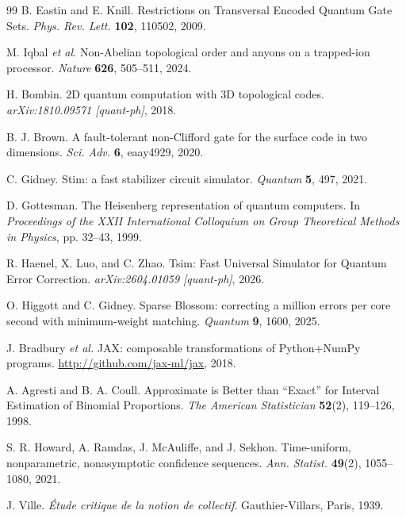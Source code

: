 \documentclass[a4paper]{article}
\begin{document}
\begin{thebibliography}{99}
B. Eastin and E. Knill.
\newblock Restrictions on Transversal Encoded Quantum Gate Sets.
\newblock \textit{Phys. Rev. Lett.} \textbf{102}, 110502, 2009.

M. Iqbal \textit{et al.}
\newblock Non-Abelian topological order and anyons on a trapped-ion processor.
\newblock \textit{Nature} \textbf{626}, 505--511, 2024.

H. Bombin.
\newblock 2D quantum computation with 3D topological codes.
\newblock \textit{arXiv:1810.09571 [quant-ph]}, 2018.

B. J. Brown.
\newblock A fault-tolerant non-Clifford gate for the surface code in two dimensions.
\newblock \textit{Sci. Adv.} \textbf{6}, eaay4929, 2020.

C. Gidney.
\newblock Stim: a fast stabilizer circuit simulator.
\newblock \textit{Quantum} \textbf{5}, 497, 2021.

D. Gottesman.
\newblock The Heisenberg representation of quantum computers.
\newblock In \textit{Proceedings of the XXII International Colloquium on Group Theoretical Methods in Physics}, pp. 32--43, 1999.

R. Haenel, X. Luo, and C. Zhao.
\newblock Tsim: Fast Universal Simulator for Quantum Error Correction.
\newblock \textit{arXiv:2604.01059 [quant-ph]}, 2026.

O. Higgott and C. Gidney.
\newblock Sparse Blossom: correcting a million errors per core second with minimum-weight matching.
\newblock \textit{Quantum} \textbf{9}, 1600, 2025.

J. Bradbury \textit{et al.}
\newblock JAX: composable transformations of Python+NumPy programs.
\newblock \url{http://github.com/jax-ml/jax}, 2018.

A. Agresti and B. A. Coull.
\newblock Approximate is Better than ``Exact'' for Interval Estimation of Binomial Proportions.
\newblock \textit{The American Statistician} \textbf{52}(2), 119--126, 1998.

S. R. Howard, A. Ramdas, J. McAuliffe, and J. Sekhon.
\newblock Time-uniform, nonparametric, nonasymptotic confidence sequences.
\newblock \textit{Ann. Statist.} \textbf{49}(2), 1055--1080, 2021.

J. Ville.
\newblock \textit{\'Etude critique de la notion de collectif}.
\newblock Gauthier-Villars, Paris, 1939.

\end{thebibliography}
\end{document}
